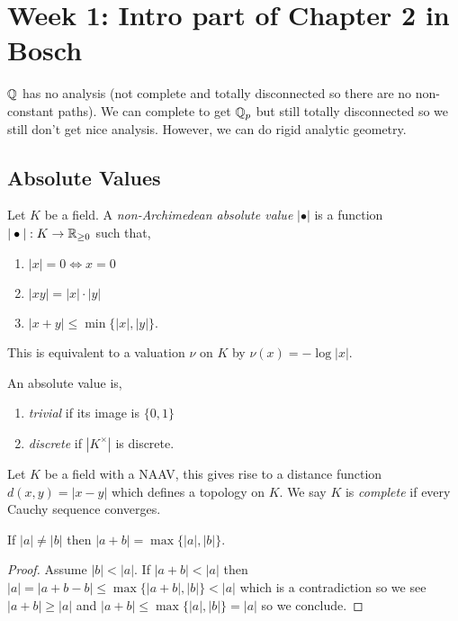 \documentclass[12pt]{article}
\begin{document}
\section{Week 1: Intro part of Chapter 2 in Bosch}

$\mathbb{Q}$ has no analysis (not complete and totally disconnected so there are no non-constant paths). We can complete to get $\mathbb{Q}_p$ but still totally disconnected so we still don't get nice analysis. However, we can do rigid analytic geometry. 

\subsection{Absolute Values}

\begin{defn}
Let $K$ be a field. A \textit{non-Archimedean absolute value} $| \bullet |$ is a function $| \bullet | : K \to \mathbb{R}_{\ge 0}$ such that,
\begin{enumerate}
\item $|x| = 0 \iff x = 0$
\item $|x y| = |x| \cdot |y|$
\item $|x + y| \le \min \{ |x|, |y| \}$.
\end{enumerate}
\end{defn}

\begin{rmk}
This is equivalent to a valuation $\nu$ on $K$ by $\nu(x) = - \log{|x|}$.
\end{rmk}

\begin{defn}
An absolute value is,
\begin{enumerate}
\item \textit{trivial} if its image is $\{0,1\}$
\item \textit{discrete} if $|K^\times|$ is discrete.
\end{enumerate}
\end{defn}

\begin{defn}
Let $K$ be a field with a NAAV, this gives rise to a distance function $d(x,y) = |x-y|$ which defines a topology on $K$. We say $K$ is \textit{complete} if every Cauchy sequence converges.
\end{defn}

\begin{prop}
If $|a| \neq |b|$ then $|a+b| = \max\{ |a|, |b| \}$.
\end{prop}

\begin{proof}
Assume $|b| < |a|$. If $|a+b| < |a|$ then $|a| = |a+b-b| \le \max \{ |a+b|, |b| \} < |a|$ which is a contradiction so we see $|a+b| \ge |a|$ and $|a+b| \le \max \{ |a|, |b| \} = |a|$ so we conclude.
\end{proof}
\end{document}
